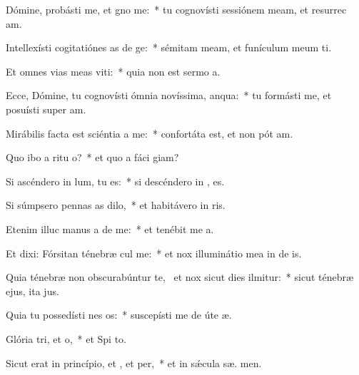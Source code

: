 \item Dómine, probásti me, et gno me:~* tu cognovísti sessiónem meam, et resurrec am.
\item Intellexísti cogitatiónes as de ge:~* sémitam meam, et funículum meum ti.
\item Et omnes vias meas viti:~* quia non est sermo   a.
\item Ecce, Dómine, tu cognovísti ómnia novíssima,  anqua:~* tu formásti me, et posuísti super   am.
\item Mirábilis facta est sciéntia a  me:~* confortáta est, et non pót  am.
\item Quo ibo a ritu o?~* et quo a fáci  giam?
\item Si ascéndero in lum, tu  es:~* si descéndero in , es.
\item Si súmpsero pennas as dilo,~* et habitávero in  ris.
\item Etenim illuc manus a de me:~* et tenébit me  a.
\item Et dixi: Fórsitan ténebræ cul me:~* et nox illuminátio mea in de is.
\item Quia ténebræ non obscurabúntur  te,~\pscross{} et nox sicut dies ilmitur:~* sicut ténebræ ejus, ita   jus.
\item Quia tu possedísti nes os:~* suscepísti me de úte  æ.
\item Glória tri, et o,~* et Spi to.
\item Sicut erat in princípio, et , et per,~* et in sǽcula sæ. men.
